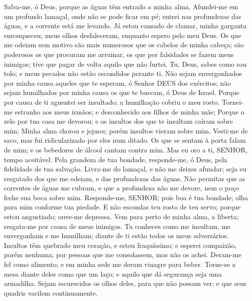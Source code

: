 {\PP 
  Salva-me, ó Deus, porque as águas têm entrado
{} a minha alma.
  Afundei-me em um profundo lamaçal, onde não se pode ficar em pé; entrei nas profundezas das águas, e a corrente está me levando.
  Já estou cansado de clamar, minha garganta enrouqueceu; meus olhos desfaleceram, enquanto espero pelo meu Deus.
  Os que me odeiam sem motivo são mais numerosos que os cabelos de minha cabeça; são poderosos os que procuram me arruinar, os que por falsidades se fazem meus inimigos; tive que pagar de volta aquilo que não furtei.
  Tu, Deus, sabes como sou tolo; e meus pecados não estão escondidos perante ti.
  Não sejam envergonhados por minha causa aqueles que te esperam, ó Senhor DEUS dos exércitos; não sejam humilhados por minha causa os que te buscam, ó Deus de Israel.
  Porque por causa de ti aguentei ser insultado; a humilhação cobriu o meu rosto.
  Tornei-me estranho aos meus irmãos; e desconhecido aos filhos de minha mãe;
  Porque o zelo por tua casa me devorou; e os insultos dos que te insultam caíram sobre mim;
  Minha alma chorou e jejuou; porém
{} insultos vieram sobre mim.
  Vesti-me de saco, mas fui ridicularizado por eles num ditado.
  Os que se sentam à porta falam
{} de mim; e os bebedores de álcool cantam
{} contra mim.
  Mas eu oro a ti, SENHOR,
{} tempo aceitável. Pela grandeza de tua bondade, responde-me, ó Deus, pela fidelidade de tua salvação.
  Livra-me do lamaçal, e não me deixes afundar; seja eu resgatado dos que me odeiam, e das profundezas das águas.
  Não permitas que as correntes de águas me cubram, e que a profundeza não me devore, nem o poço feche sua boca sobre mim.
  Responde-me, SENHOR; pois boa é tua bondade; olha para mim conforme tua piedade.
  E não escondas teu rosto de teu servo; porque estou angustiado; ouve-me depressa.
  Vem para perto de minha alma,
{} a liberta; resgata-me por causa de meus inimigos.
  Tu conheces como me insultam, me envergonham e me humilham; diante de ti estão todos os meus adversários.
  Insultos têm quebrado meu coração, e estou fraquíssimo; e esperei compaixão, porém
{} nenhuma;
{} por pessoas que me consolassem, mas não os achei.
  Deram-me fel como alimento; e em minha sede me deram vinagre para beber.
  Torne-se a mesa diante deles como que um laço; e aquilo que
{} dá segurança
{} seja uma armadilha.
  Sejam escurecidos os olhos deles, para que não possam ver; e que seus quadris vacilem continuamente.
}
